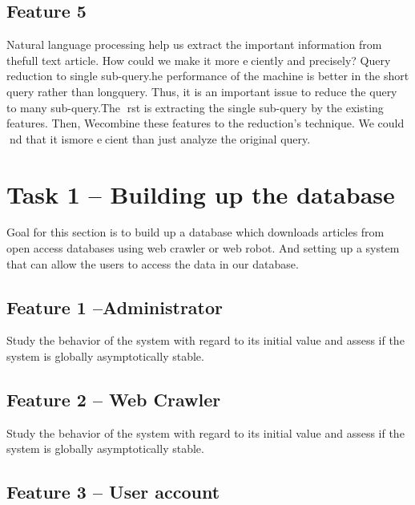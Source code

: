 \documentclass[a4paper]{article} %
\begin{document}
\subsection*{Feature 5 }
\label{task1:feature5}
Natural language processing help us extract the important information from thefull text article.  How could we make it more eciently and precisely?
Query reduction to single sub-query.he performance of the machine is better in the short query rather than longquery.  Thus, it is an important issue to reduce the query to many sub-query.The rst is extracting the single sub-query by the existing features.  Then, Wecombine these features to the reduction's technique.  We could nd that it ismore ecient than just analyze the original query.




\section*{Task 1 -- Building up the database}
\label{task1}

Goal for this section is to build up a database which downloads articles from open access databases using web crawler or web robot. And setting up a system that can allow the users to access the data in our database.

\subsection*{Feature 1 --Administrator}
\label{task1:feature1}

Study the behavior of the system with regard to its initial value and assess if the system is globally asymptotically stable.

\subsection*{Feature 2 -- Web Crawler}
\label{task1:feature2}

Study the behavior of the system with regard to its initial value and assess if the system is globally asymptotically stable.

\subsection*{Feature 3 -- User account}
\label{task1:feature3}
\end{document}
